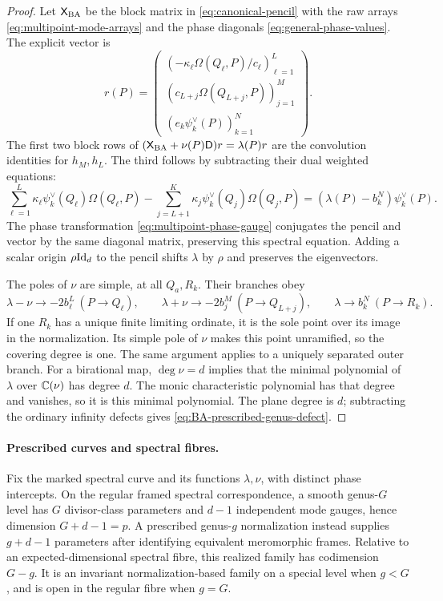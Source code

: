 \begin{proof}
Let $\mathsf X_{\rm BA}$ be the block matrix in
\cref{eq:canonical-pencil} with the raw arrays
\cref{eq:multipoint-mode-arrays} and the phase diagonals
\cref{eq:general-phase-values}. The explicit vector is
\begin{equation}\label{eq:BA-prescribed-eigenvector}
 r(P)=\begin{pmatrix}
 (-\kappa_{\ell}\Omega(Q_{\ell},P)/c_{\ell})_{\ell=1}^{L}\\
 (c_{L+j}\Omega(Q_{L+j},P))_{j=1}^{M}\\
 (e_k\psi_k^\vee(P))_{k=1}^{N}
 \end{pmatrix}.
\end{equation}
The first two block rows of
$(\mathsf X_{\rm BA}+\nu(P)\mathsf D)r=\lambda(P)r$
are the convolution identities for $h_M,h_L$. The third follows by
subtracting their dual weighted equations:
\[
 \sum_{\ell=1}^{L}\kappa_{\ell}\psi_k^\vee(Q_{\ell})\Omega(Q_{\ell},P)
 -\sum_{j=L+1}^{K}\kappa_j\psi_k^\vee(Q_j)\Omega(Q_j,P)
 =(\lambda(P)-b_k^N)\psi_k^\vee(P).
\]
The phase transformation \cref{eq:multipoint-phase-gauge} conjugates
the pencil and vector by the same diagonal matrix, preserving this
spectral equation. Adding a scalar origin $\rho\mathrm{Id}_d$ to the
pencil shifts $\lambda$ by $\rho$ and preserves the eigenvectors.

The poles of $\nu$ are simple, at all $Q_a,R_k$. Their branches obey
\[
 \lambda-\nu\to-2b_{\ell}^L\ (P\to Q_{\ell}),\qquad
 \lambda+\nu\to-2b_j^M\ (P\to Q_{L+j}),\qquad
 \lambda\to b_k^N\ (P\to R_k).
\]
If one $R_k$ has a unique finite limiting ordinate, it is the sole
point over its image in the normalization. Its simple pole of $\nu$
makes this point unramified, so the covering degree is one.
The same argument applies to a uniquely separated outer branch.
For a birational map, $\deg\nu=d$ implies that the minimal polynomial
of $\lambda$ over $\mathbb C(\nu)$ has degree $d$. The monic characteristic
polynomial has that degree and vanishes, so it is this minimal
polynomial. The plane degree is $d$; subtracting the ordinary
infinity defects gives \cref{eq:BA-prescribed-genus-defect}.
\end{proof}

\paragraph{Prescribed curves and spectral fibres.}
Fix the marked spectral curve and its functions $\lambda,\nu$,
with distinct phase intercepts. On the regular framed spectral
correspondence, a smooth genus-$G$ level has $G$ divisor-class
parameters and $d-1$ independent mode gauges, hence dimension
$G+d-1=p$. A prescribed genus-$g$ normalization instead supplies
$g+d-1$ parameters after identifying equivalent meromorphic frames.
Relative to an expected-dimensional spectral fibre, this realized
family has codimension $G-g$. It is an invariant normalization-based
family on a special level when $g<G$, and is open in the regular
fibre when $g=G$.

